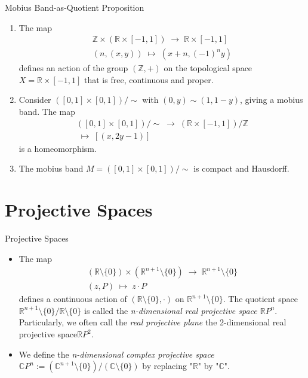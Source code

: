 \begin{proposition}{Mobius Band-as-Quotient Proposition}\\
\begin{enumerate}
    \item The map 
    $$\substack{\mathbb{Z} \times (\mathbb{R} \times [-1,1]) \;\to\; \mathbb{R} \times [-1,1] \\
    (n,(x,y)) \;\mapsto\; (x+n, (-1)^ny)}$$
    defines an action of the group $(\mathbb{Z},+)$ on the topological space $X=\mathbb{R} \times [-1,1]$ that is free, continuous and proper.

    \item Consider $([0,1] \times [0,1])/\sim$ with $(0,y) \sim (1,1-y)$, giving a mobius band. The map
    $$\substack{([0,1] \times [0,1])/\sim \;\to\; (\mathbb{R} \times [-1,1])/\mathbb{Z}\\
    [(x,y)] \;\mapsto\; [(x,2y-1)]}$$
    is a homeomorphism.

    \item The mobius band $M= ([0,1] \times [0,1])/\sim$ is compact and Hausdorff.
\end{enumerate}
\end{proposition}

\section{Projective Spaces}

\begin{definition}{Projective Spaces}\\
\begin{itemize}
    \item The map
    $$\substack{(\mathbb{R} \setminus \{0\}) \times (\mathbb{R}^{n+1} \setminus \{0\}) \;\to\; \mathbb{R}^{n+1}\setminus \{0\}\\
    (z,P) \;\mapsto\; z\cdot P}$$
    defines a continuous action of $(\mathbb{R} \setminus \{0\},\cdot)$ on $\mathbb{R}^{n+1} \setminus \{0\}$. The quotient space $\mathbb{R}^{n+1} \setminus \{0\} / \mathbb{R} \setminus \{0\}$ is called the \textit{n-dimensional real projective space $\mathbb{R}P^n$}. Particularly, we often call the \textit{real projective plane} the 2-dimensional real projective space$\mathbb{R}P^2$.

    \item We define the \textit{n-dimensional complex projective space $\mathbb{C}P^n := (\mathbb{C}^{n+1} \setminus \{0\}) / (\mathbb{C} \setminus \{0\})$} by replacing "$\mathbb{R}$" by "$\mathbb{C}$".
\end{itemize}
\end{definition}

